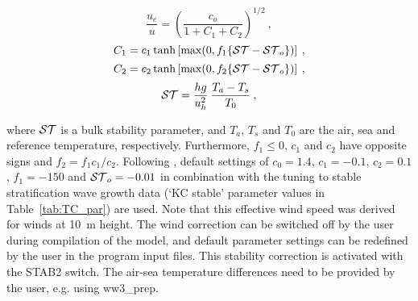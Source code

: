
\begin{equation}
\frac{u_e}{u} = \left ( \frac{c_o}{1 + C_1 + C_2} \right )^{1/2}
\: , \label{eq:scor} \end{equation} \begin{equation}
C_1 = c_1 \tanh \left [ \max ( 0 , f_1 \{ \ST - \ST_o \} ) \right ]
\: , \label{eq:c1} \end{equation} \begin{equation}
C_2 = c_2 \tanh \left [ \max ( 0 , f_2 \{ \ST - \ST_o \} ) \right ]
\: , \label{eq:c2} \end{equation} \begin{equation}
\ST = \frac{h g}{u_h^2} \: \frac{T_a - T_s}{T_0}
\: , \label{eq:stab} \end{equation}

\noindent
where ${\cal ST}$ is a bulk stability parameter, and $T_a$, $T_s$ and $T_0$ are the
air, sea and reference temperature, respectively. Furthermore, $f_1 \leq 0$,
$c_1$ and $c_2$ have opposite signs and $f_2 = f_1 c_1 / c_2$. Following
\cite{tol:OMB02a}, default settings of $c_0 = 1.4$, $c_1 = -0.1$, $c_2 = 0.1$,
$f_1 = -150$ and ${\cal ST}_o = -0.01$ in combination with the tuning to stable
stratification wave growth data (`KC stable' parameter values in
Table~\ref{tab:TC_par}) are used. Note that this effective wind speed was
derived for winds at 10~m height. The wind correction can be switched off by
the user during compilation of the model, and default parameter settings can
be redefined by the user in the program input files. This stability correction
is activated with the {\code STAB2} switch. The air-sea temperature differences
need to be provided by the user, e.g. using {\file ww3\_prep}.
